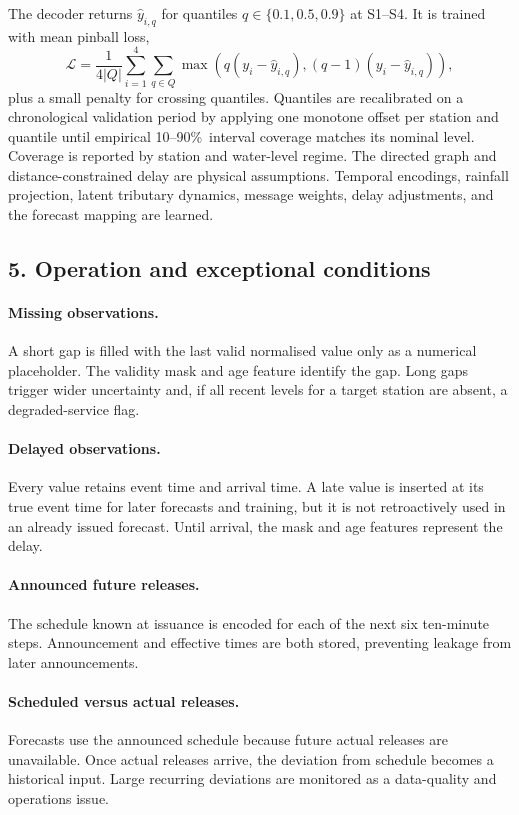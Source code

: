 \documentclass{article}
\newcommand{\pct}{\%\ }
\begin{document}
The decoder returns $\hat y_{i,q}$ for quantiles $q\in\{0.1,0.5,0.9\}$ at S1--S4. It is trained with mean pinball loss,
\begin{equation}
  \mathcal{L}=
  \frac{1}{4|Q|}\sum_{i=1}^{4}\sum_{q\in Q}
  \max\!\left(q(y_i-\hat y_{i,q}),(q-1)(y_i-\hat y_{i,q})\right),
\end{equation}
plus a small penalty for crossing quantiles. Quantiles are recalibrated on a chronological validation period by applying one monotone offset per station and quantile until empirical 10--90\pct interval coverage matches its nominal level. Coverage is reported by station and water-level regime. The directed graph and distance-constrained delay are physical assumptions. Temporal encodings, rainfall projection, latent tributary dynamics, message weights, delay adjustments, and the forecast mapping are learned.

\subsection*{5. Operation and exceptional conditions}

\paragraph{Missing observations.}
A short gap is filled with the last valid normalised value only as a numerical placeholder. The validity mask and age feature identify the gap. Long gaps trigger wider uncertainty and, if all recent levels for a target station are absent, a degraded-service flag.

\paragraph{Delayed observations.}
Every value retains event time and arrival time. A late value is inserted at its true event time for later forecasts and training, but it is not retroactively used in an already issued forecast. Until arrival, the mask and age features represent the delay.

\paragraph{Announced future releases.}
The schedule known at issuance is encoded for each of the next six ten-minute steps. Announcement and effective times are both stored, preventing leakage from later announcements.

\paragraph{Scheduled versus actual releases.}
Forecasts use the announced schedule because future actual releases are unavailable. Once actual releases arrive, the deviation from schedule becomes a historical input. Large recurring deviations are monitored as a data-quality and operations issue.
\end{document}

